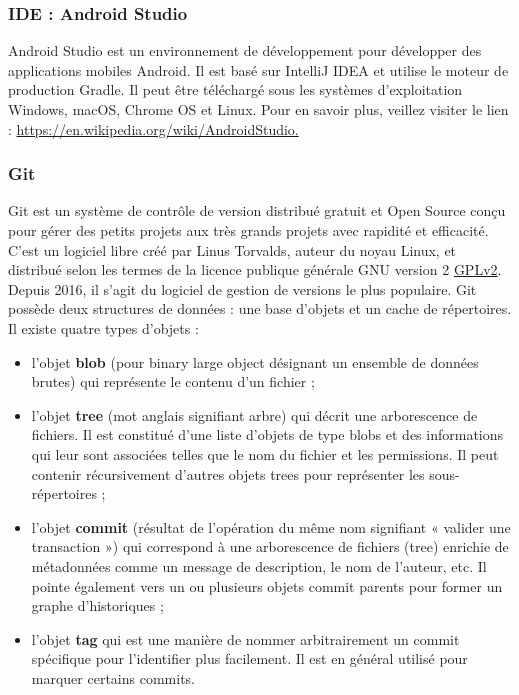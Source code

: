 \subsubsection{IDE : Android Studio}
Android Studio est un environnement de développement pour développer des applications mobiles Android. Il est basé sur IntelliJ IDEA et utilise le moteur de production Gradle. Il peut être téléchargé sous les systèmes d'exploitation Windows, macOS, Chrome OS et Linux.
\newline Pour en savoir plus, veillez
visiter le lien : \href{https://en.wikipedia.org/wiki/AndroidStudio.}{https://en.wikipedia.org/wiki/AndroidStudio.}
\subsubsection{Git}
Git est un système de contrôle de version distribué gratuit et Open Source conçu pour gérer des
petits projets aux très grands projets avec rapidité et efficacité. C'est un logiciel libre créé par
Linus Torvalds, auteur du noyau Linux, et distribué selon les termes de la licence publique
générale GNU version 2 \href{https://edu.casio.com/support/fr/gplv2.html}{GPLv2}. Depuis 2016, il s’agit du logiciel de gestion de versions le
plus populaire. Git possède deux structures de données : une base d'objets et un cache de
répertoires. Il existe quatre types d'objets :
\begin{itemize}[label=$\ast$]
	
	\item  l'objet \textbf{blob} (pour binary large object désignant un ensemble de données brutes) qui
	représente le contenu d'un fichier ;
	\item l'objet \textbf{tree} (mot anglais signifiant arbre) qui décrit une arborescence de fichiers. Il est
	constitué d'une liste d'objets de type blobs et des informations qui leur sont associées
	telles que le nom du fichier et les permissions. Il peut contenir récursivement d'autres
	objets trees pour représenter les sous-répertoires ;
	\item l'objet \textbf{commit} (résultat de l'opération du même nom signifiant « valider une transaction
	») qui correspond à une arborescence de fichiers (tree) enrichie de métadonnées comme
	un message de description, le nom de l'auteur, etc. Il pointe également vers un ou
	plusieurs objets commit parents pour former un graphe d'historiques ;
	\item l'objet \textbf{tag} qui est une manière de nommer arbitrairement un commit
	spécifique pour l'identifier plus facilement. Il est en général utilisé pour marquer certains
	commits.
	
\end{itemize}


